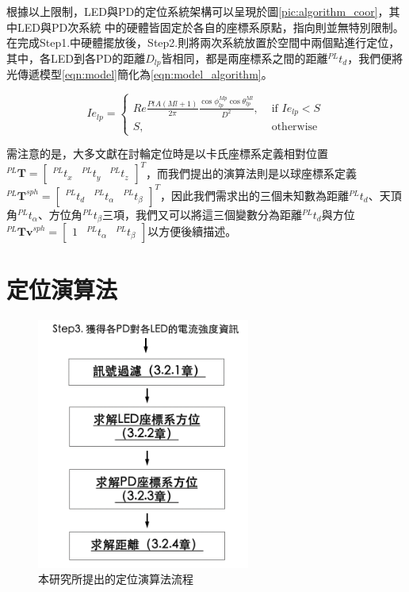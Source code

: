     根據以上限制，LED與PD的定位系統架構可以呈現於圖\ref{pic:algorithm_coor}，其中LED與PD次系統
    中的硬體皆固定於各自的座標系原點，指向則並無特別限制。在完成Step1.中硬體擺放後，Step2.則將兩次系統放置於空間中兩個點進行定位，其中，各LED到各PD的距離$D_{lp}$皆相同，都是兩座標系之間的距離$^{PL}t_d$，我們便將光傳遞模型\ref{eqn:model}簡化為\ref{eqn:model_algorithm}。

    \begin{equation}
        \label{eqn:model_algorithm}
        Ie_{lp} = \begin{cases}Re\frac{PtA(Ml+1)}{2\pi}\frac{\cos\phi_{lp}^{Mp}\cos \theta_{lp}^{Ml}}{D^2} , & \text { if } Ie_{lp}<S \\ S, & \text { otherwise }\end{cases}
    \end{equation}

    需注意的是，大多文獻在討輪定位時是以卡氏座標系定義相對位置$^{PL}\boldsymbol{T}=\left[\begin{array}{ccc}^{PL}t_x&^{PL}t_y&^{PL}t_z\end{array}\right]^T$，而我們提出的演算法則是以球座標系定義$^{PL}\boldsymbol{T}^{sph}=\left[\begin{array}{ccc}^{PL}t_d&^{PL}t_{\alpha}&^{PL}t_{\beta}\end{array}\right]^T$，因此我們需求出的三個未知數為距離$^{PL}t_d$、天頂角$^{PL}t_\alpha$、方位角$^{PL}t_\beta$三項，我們又可以將這三個變數分為距離$^{PL}t_d$與方位$^{PL}\boldsymbol{Tv}^{sph} = \left[\begin{array}{ccc}1&^{PL}t_{\alpha}&^{PL}t_{\beta}\end{array}\right]$以方便後續描述。



\section{定位演算法}
\label{chp:algorithm}

\begin{figure}[htpb]
    \centering
    \includegraphics[width=7cm]{ch3pic/algorithm_flow.png}
    \caption{本研究所提出的定位演算法流程}
    \label{pic:algorithm_flow}
\end{figure}

